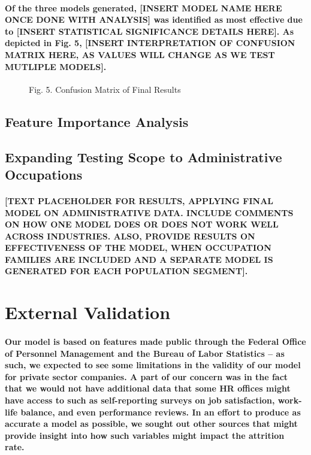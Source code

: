 \documentclass{article}
\begin{document}
\paragraph{Of the three models generated, [INSERT MODEL NAME HERE ONCE DONE WITH ANALYSIS] was identified as most effective due to [INSERT STATISTICAL SIGNIFICANCE DETAILS HERE]. As depicted in Fig. 5, [INSERT INTERPRETATION OF CONFUSION MATRIX HERE, AS VALUES WILL CHANGE AS WE TEST MUTLIPLE MODELS].}
 
\begin{figure}
\caption{Fig. 5. Confusion Matrix of Final Results}
\end{figure}

\subsection{Feature Importance Analysis}

\subsection{Expanding Testing Scope to Administrative Occupations}

\paragraph{[TEXT PLACEHOLDER FOR RESULTS, APPLYING FINAL MODEL ON ADMINISTRATIVE DATA. INCLUDE COMMENTS ON HOW ONE MODEL DOES OR DOES NOT WORK WELL ACROSS INDUSTRIES. ALSO, PROVIDE RESULTS ON EFFECTIVENESS OF THE MODEL, WHEN OCCUPATION FAMILIES ARE INCLUDED AND A SEPARATE MODEL IS GENERATED FOR EACH POPULATION SEGMENT].}

\section{External Validation}

\paragraph{Our model is based on features made public through the Federal Office of Personnel Management and the Bureau of Labor Statistics – as such, we expected to see some limitations in the validity of our model for private sector companies. A part of our concern was in the fact that we would not have additional data that some HR offices might have access to such as self-reporting surveys on job satisfaction, work-life balance, and even performance reviews. In an effort to produce as accurate a model as possible, we sought out other sources that might provide insight into how such variables might impact the attrition rate.}
\end{document}
